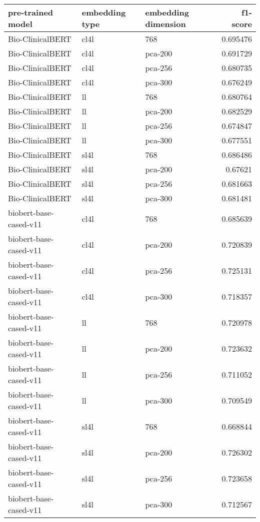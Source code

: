 \begin{tabular}{lllr}
\hline
 pre-trained model      & embedding type   & embedding dimension   &   f1-score \\
\hline
 Bio-ClinicalBERT       & cl4l             & 768                   &   0.695476 \\
 Bio-ClinicalBERT       & cl4l             & pca-200               &   0.691729 \\
 Bio-ClinicalBERT       & cl4l             & pca-256               &   0.680735 \\
 Bio-ClinicalBERT       & cl4l             & pca-300               &   0.676249 \\
 Bio-ClinicalBERT       & ll               & 768                   &   0.680764 \\
 Bio-ClinicalBERT       & ll               & pca-200               &   0.682529 \\
 Bio-ClinicalBERT       & ll               & pca-256               &   0.674847 \\
 Bio-ClinicalBERT       & ll               & pca-300               &   0.677551 \\
 Bio-ClinicalBERT       & sl4l             & 768                   &   0.686486 \\
 Bio-ClinicalBERT       & sl4l             & pca-200               &   0.67621  \\
 Bio-ClinicalBERT       & sl4l             & pca-256               &   0.681663 \\
 Bio-ClinicalBERT       & sl4l             & pca-300               &   0.681481 \\
 biobert-base-cased-v11 & cl4l             & 768                   &   0.685639 \\
 biobert-base-cased-v11 & cl4l             & pca-200               &   0.720839 \\
 biobert-base-cased-v11 & cl4l             & pca-256               &   0.725131 \\
 biobert-base-cased-v11 & cl4l             & pca-300               &   0.718357 \\
 biobert-base-cased-v11 & ll               & 768                   &   0.720978 \\
 biobert-base-cased-v11 & ll               & pca-200               &   0.723632 \\
 biobert-base-cased-v11 & ll               & pca-256               &   0.711052 \\
 biobert-base-cased-v11 & ll               & pca-300               &   0.709549 \\
 biobert-base-cased-v11 & sl4l             & 768                   &   0.668844 \\
 biobert-base-cased-v11 & sl4l             & pca-200               &   0.726302 \\
 biobert-base-cased-v11 & sl4l             & pca-256               &   0.723658 \\
 biobert-base-cased-v11 & sl4l             & pca-300               &   0.712567 \\
\hline
\end{tabular}